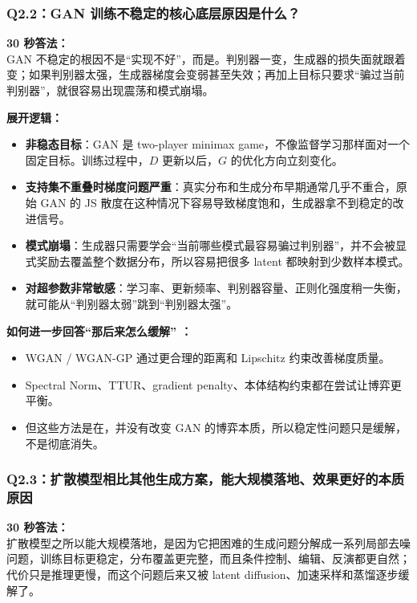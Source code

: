 \subsubsection{Q2.2：GAN 训练不稳定的核心底层原因是什么？}

\begin{conceptbox}
\textbf{30 秒答法：}\\
GAN 不稳定的根因不是“实现不好”，而是。判别器一变，生成器的损失面就跟着变；如果判别器太强，生成器梯度会变弱甚至失效；再加上目标只要求“骗过当前判别器”，就很容易出现震荡和模式崩塌。
\end{conceptbox}

\textbf{展开逻辑：}
\begin{itemize}[leftmargin=1.5em]
  \item \textbf{非稳态目标}：GAN 是 two-player minimax game，不像监督学习那样面对一个固定目标。训练过程中，$D$ 更新以后，$G$ 的优化方向立刻变化。
  \item \textbf{支持集不重叠时梯度问题严重}：真实分布和生成分布早期通常几乎不重合，原始 GAN 的 JS 散度在这种情况下容易导致梯度饱和，生成器拿不到稳定的改进信号。
  \item \textbf{模式崩塌}：生成器只需要学会“当前哪些模式最容易骗过判别器”，并不会被显式奖励去覆盖整个数据分布，所以容易把很多 latent 都映射到少数样本模式。
  \item \textbf{对超参数非常敏感}：学习率、更新频率、判别器容量、正则化强度稍一失衡，就可能从“判别器太弱”跳到“判别器太强”。
\end{itemize}

\textbf{如何进一步回答“那后来怎么缓解” ：}
\begin{itemize}[leftmargin=1.5em]
  \item WGAN / WGAN-GP 通过更合理的距离和 Lipschitz 约束改善梯度质量。
  \item Spectral Norm、TTUR、gradient penalty、本体结构约束都在尝试让博弈更平衡。
  \item 但这些方法是在，并没有改变 GAN 的博弈本质，所以稳定性问题只是缓解，不是彻底消失。
\end{itemize}

\subsubsection{Q2.3：扩散模型相比其他生成方案，能大规模落地、效果更好的本质原因}

\begin{conceptbox}
\textbf{30 秒答法：}\\
扩散模型之所以能大规模落地，是因为它把困难的生成问题分解成一系列局部去噪问题，训练目标更稳定，分布覆盖更完整，而且条件控制、编辑、反演都更自然；代价只是推理更慢，而这个问题后来又被 latent diffusion、加速采样和蒸馏逐步缓解了。
\end{conceptbox}

